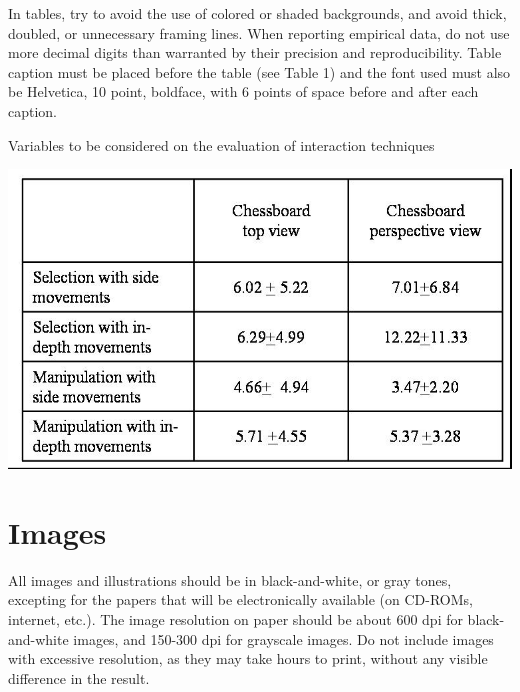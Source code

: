 \documentclass[12pt]{article}
\begin{document}
In tables, try to avoid the use of colored or shaded backgrounds, and avoid
thick, doubled, or unnecessary framing lines. When reporting empirical data,
do not use more decimal digits than warranted by their precision and
reproducibility. Table caption must be placed before the table (see Table 1)
and the font used must also be Helvetica, 10 point, boldface, with 6 points of
space before and after each caption.

\begin{table}[ht]
\centering
\caption{Variables to be considered on the evaluation of interaction
  techniques}
\label{tab:exTable1}
\includegraphics[width=.7\textwidth]{table.jpg}
\end{table}

\section{Images}

All images and illustrations should be in black-and-white, or gray tones,
excepting for the papers that will be electronically available (on CD-ROMs,
internet, etc.). The image resolution on paper should be about 600 dpi for
black-and-white images, and 150-300 dpi for grayscale images.  Do not include
images with excessive resolution, as they may take hours to print, without any
visible difference in the result. 
\end{document}
